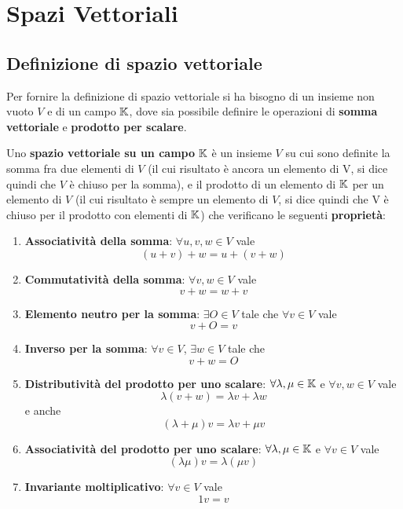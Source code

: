\chapter{Spazi Vettoriali}

\section{Definizione di spazio vettoriale}
Per fornire la definizione di spazio vettoriale si ha bisogno di un insieme non vuoto $V$ e di un campo
$\mathbb{K}$, dove sia possibile definire le operazioni di \textbf{somma vettoriale} e
\textbf{prodotto per scalare}.

\begin{definition}
	Uno \textbf{spazio vettoriale su un campo} $\mathbb{K}$ è un insieme $V$ su cui sono definite la somma
	fra due elementi di $V$ (il cui risultato è ancora un elemento di V, si dice quindi che $V$ è chiuso
	per la somma), e il prodotto di un elemento di $\mathbb{K}$ per un elemento di $V$ (il cui risultato è
	sempre un elemento di $V$, si dice quindi che V è chiuso per il prodotto con elementi di $\mathbb{K}$)
	che verificano le seguenti \textbf{proprietà}:
	\begin{enumerate}
		\item \textbf{Associatività della somma}: $\forall u, v, w \in V$ vale
		      \[ (u + v) + w = u + (v + w) \]
		\item \textbf{Commutatività della somma}: $\forall v, w \in V$ vale
		      \[ v + w = w + v \]
		\item \textbf{Elemento neutro per la somma}: $\exists O \in V$ tale che $\forall v \in V$ vale
		      \[ v + O = v \]
		\item \textbf{Inverso per la somma}: $\forall v \in V$, $\exists w \in V$ tale che
		      \[ v + w = O \]
		\item \textbf{Distributività del prodotto per uno scalare}: $\forall \lambda, \mu \in \mathbb{K}$ e
		      $\forall v, w \in V$ vale
		      \[ \lambda(v + w) = \lambda v + \lambda w \]
		      e anche
		      \[ (\lambda + \mu)v = \lambda v + \mu v \]
		\item \textbf{Associatività del prodotto per uno scalare}: $\forall \lambda, \mu \in \mathbb{K}$ e
		      $\forall v \in V$ vale
		      \[ (\lambda \mu)v = \lambda(\mu v) \]
		\item \textbf{Invariante moltiplicativo}: $\forall v \in V$ vale
		      \[ 1v = v \]
	\end{enumerate}
\end{definition}

